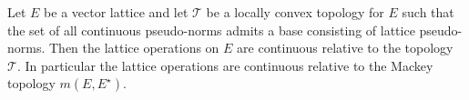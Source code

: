 Let $E$ be a vector lattice and let $\mathcal{T}$ be a locally convex topology for $E$ such that the set of all continuous pseudo-norms admits a base consisting of lattice pseudo-norms. Then the lattice operations on $E$ are continuous relative to the topology $\mathcal{T}$. In particular the lattice operations are continuous relative to the Mackey topology $m(E,E^{\star})$.
